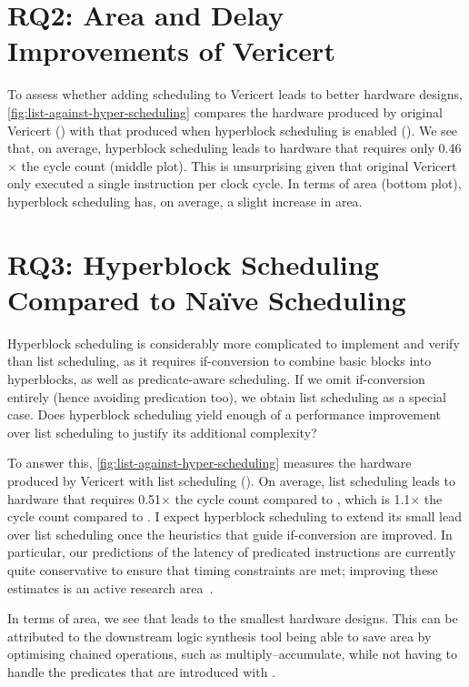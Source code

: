 \section{RQ2: Area and Delay Improvements of Vericert}

To assess whether adding scheduling to Vericert leads to better hardware
designs, \cref{fig:list-against-hyper-scheduling} compares the hardware produced
by original Vericert (\VericertBase{}) with that produced when hyperblock
scheduling is enabled (\VericertHyper{}). We see that, on average, hyperblock
scheduling leads to hardware that requires only 0.46$\times$ the cycle count
(middle plot). This is unsurprising given that original Vericert only executed a
single instruction per clock cycle. In terms of area (bottom plot), hyperblock
scheduling has, on average, a slight increase in area.

\section{RQ3: Hyperblock Scheduling Compared to Na\"ive Scheduling}

Hyperblock scheduling is considerably more complicated to implement and verify
than list scheduling, as it requires if-conversion to combine basic blocks into
hyperblocks, as well as predicate-aware scheduling. If we omit if-conversion
entirely (hence avoiding predication too), we obtain list scheduling as a
special case. Does hyperblock scheduling yield enough of a performance
improvement over list scheduling to justify its additional complexity?

To answer this, \cref{fig:list-against-hyper-scheduling} measures the hardware
produced by Vericert with list scheduling (\VericertList{}). On average, list
scheduling leads to hardware that requires 0.51$\times$ the cycle count compared
to \VericertBase{}, which is 1.1$\times$ the cycle count compared to
\VericertHyper{}. I expect hyperblock scheduling to extend its small lead over
list scheduling once the heuristics that guide if-conversion are improved.  In
particular, our predictions of the latency of predicated instructions are
currently quite conservative to ensure that timing constraints are met;
improving these estimates is an active research
area~\cite{tan15_mappin_lut_fpgas,rizzi23_iterat_method_mappin_aware_frequen,wang23_mapbuf,ustun20_accur_fpga_hls,zheng14_fast_effec_placem_routin_direc}.

In terms of area, we see that \VericertList{} leads to the smallest hardware
designs. This can be attributed to the downstream logic synthesis tool being
able to save area by optimising chained operations, such as
multiply--accumulate, while not having to handle the predicates that are
introduced with \VericertHyper{}.

